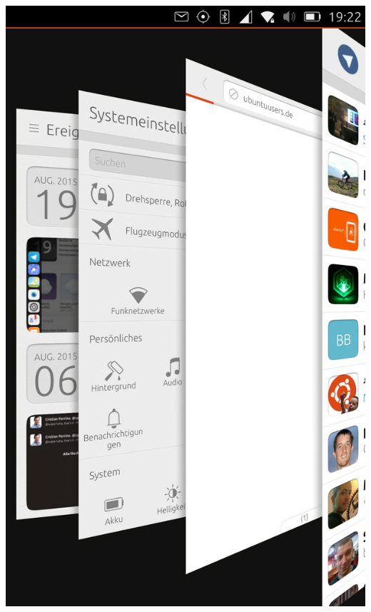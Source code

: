 \documentclass{beamer}
\begin{document}
\begin{frame}
\begin{columns}
      \includegraphics[width=\textwidth]{images/appswitcher}
  \end{columns}
  
\end{frame}
\end{document}
